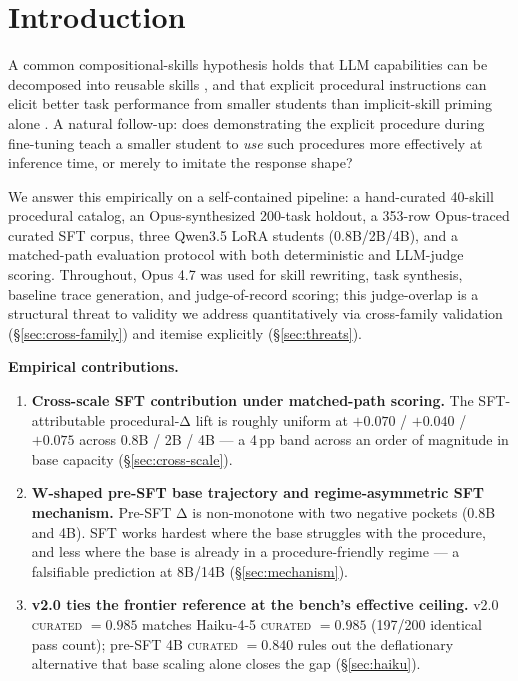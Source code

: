 \documentclass[10pt]{article}
\newcommand{\CU}{\textsc{curated}\xspace}
\begin{document}
\section{Introduction}

A common compositional-skills hypothesis holds that LLM capabilities can be decomposed into reusable skills \citep{yu2024skillmix,arora2023theory}, and that explicit procedural instructions can elicit better task performance from smaller students than implicit-skill priming alone \citep{li2026skillsbench}. A natural follow-up: does demonstrating the explicit procedure during fine-tuning teach a smaller student to \emph{use} such procedures more effectively at inference time, or merely to imitate the response shape?

We answer this empirically on a self-contained pipeline: a hand-curated 40-skill procedural catalog, an Opus-synthesized 200-task holdout, a 353-row Opus-traced curated SFT corpus, three Qwen3.5 LoRA students (0.8B/2B/4B), and a matched-path evaluation protocol with both deterministic and LLM-judge scoring. Throughout, Opus 4.7 was used for skill rewriting, task synthesis, baseline trace generation, and judge-of-record scoring; this judge-overlap is a structural threat to validity we address quantitatively via cross-family validation (\S\ref{sec:cross-family}) and itemise explicitly (\S\ref{sec:threats}).

\textbf{Empirical contributions.}
\begin{enumerate}[leftmargin=*]
  \item \textbf{Cross-scale SFT contribution under matched-path scoring.} The SFT-attributable procedural-Δ lift is roughly uniform at $+0.070$ / $+0.040$ / $+0.075$ across 0.8B / 2B / 4B --- a 4\,pp band across an order of magnitude in base capacity (\S\ref{sec:cross-scale}).
  \item \textbf{W-shaped pre-SFT base trajectory and regime-asymmetric SFT mechanism.} Pre-SFT Δ is non-monotone with two negative pockets (0.8B and 4B). SFT works hardest where the base struggles with the procedure, and less where the base is already in a procedure-friendly regime --- a falsifiable prediction at 8B/14B (\S\ref{sec:mechanism}).
  \item \textbf{v2.0 ties the frontier reference at the bench's effective ceiling.} v2.0 \CU{} $= 0.985$ matches Haiku-4-5 \CU{} $= 0.985$ (197/200 identical pass count); pre-SFT 4B \CU{} $= 0.840$ rules out the deflationary alternative that base scaling alone closes the gap (\S\ref{sec:haiku}).
\end{enumerate}
\end{document}
